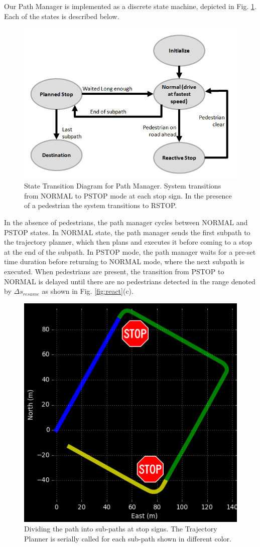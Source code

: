 \documentclass[letterpaper, 10 pt, conference]{ieeeconf}  %
\begin{document}
Our Path Manager is implemented as a discrete state machine, depicted in Fig. \ref{fig:st}.
Each of the states is described below.

\begin{figure}[tb]
  \centering
  \includegraphics[width=0.6\columnwidth]{graphics/stgraph.PNG}
  \caption{State Transition Diagram for Path Manager. System transitions from NORMAL to PSTOP mode at each stop sign. In the presence of a pedestrian the system transitions to RSTOP.}
  \label{fig:st}
\end{figure}

In the absence of pedestrians, the path manager cycles between NORMAL and PSTOP states.
In NORMAL state, the path manager sends the first subpath to the trajectory planner, which then plans and executes it before coming to a stop at the end of the subpath.
In PSTOP mode, the path manager waits for a pre-set time duration before returning to NORMAL mode, where the next subpath is executed.
When pedestrians are present, the transition from PSTOP to NORMAL is delayed until there are no pedestrians detected in the range denoted by $\Delta s_{resume}$ as shown in Fig. \ref{fig:react}(c).

\begin{figure}[tb]
  \centering
  \includegraphics[width=0.5\columnwidth]{graphics/Subpaths.png}
  \caption{
    Dividing the path into sub-paths at stop signs.
    The Trajectory Planner is serially called for each sub-path shown in different color.
  }
  \label{fig:subpathdivision}
\end{figure}
\end{document}

